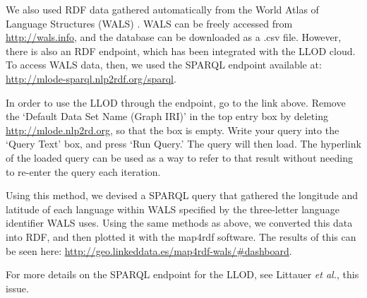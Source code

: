 

We also used RDF data gathered automatically from the World Atlas of Language Structures (WALS) \cite{Haspelmath_etal2008}. WALS can be freely accessed from \url{http://wals.info}, and the database can be downloaded as a .csv file. However, there is also an RDF endpoint, which has been integrated with the LLOD cloud. To access WALS data, then, we used the SPARQL endpoint available at: \url{http://mlode-sparql.nlp2rdf.org/sparql}.

In order to use the LLOD through the endpoint, go to the link above. Remove the `Default Data Set Name (Graph IRI)' in the top entry box by deleting \url{http://mlode.nlp2rd.org}, so that the box is empty. Write your query into the `Query Text' box, and press `Run Query.' The query will then load. The hyperlink of the loaded query can be used as a way to refer to that result without needing to re-enter the query each iteration. 

Using this method, we devised a SPARQL query that gathered the longitude and latitude of each language within WALS specified by the three-letter language identifier WALS uses. Using the same methods as above, we converted this data into RDF, and then plotted it with the map4rdf software. The results of this can be seen here: \url{http://geo.linkeddata.es/map4rdf-wals/#dashboard}. 


For more details on the SPARQL endpoint for the LLOD, see Littauer {\it et al.}, this issue. 
